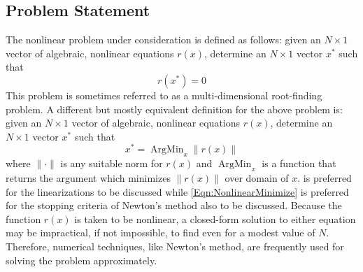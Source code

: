 \documentclass[Prelim,12pt]{WisconsinThesis}
\newcommand{\by}    {\!\times\!}
\DeclareMathOperator*{\ArgMin}{ArgMin}
\begin{document}
\subsection{Problem Statement}
The nonlinear problem under consideration is defined as follows: given an $N \by 1$ vector of algebraic, nonlinear equations $r(x)$, determine an $N \by 1$ vector $x^*$ such that
\begin{equation}
    r(x^*) = 0
    \label{Eqn:NonlinearRootFind}
\end{equation}
This problem is sometimes referred to as a multi-dimensional root-finding problem.
A different but mostly equivalent definition for the above problem is: given an $N \by 1$ vector of algebraic, nonlinear equations $r(x)$, determine an $N \by 1$ vector $x^*$ such that
\begin{equation}
    x^* = \ArgMin_{x} \|r(x)\|
    \label{Eqn:NonlinearMinimize}
\end{equation}
where $\|\cdot\|$ is any suitable norm for $r(x)$ and $\ArgMin_x$ is a function that returns the argument which minimizes $\|r(x)\|$ over domain of $x$.
 is preferred for the linearizations to be discussed while \cref{Eqn:NonlinearMinimize} is preferred for the stopping criteria of Newton's method also to be discussed.
Because the function $r(x)$ is taken to be nonlinear, a closed-form solution to either equation may be impractical, if not impossible, to find even for a modest value of $N$.
Therefore, numerical techniques, like Newton's method, are frequently used for solving the problem approximately.
\end{document}
